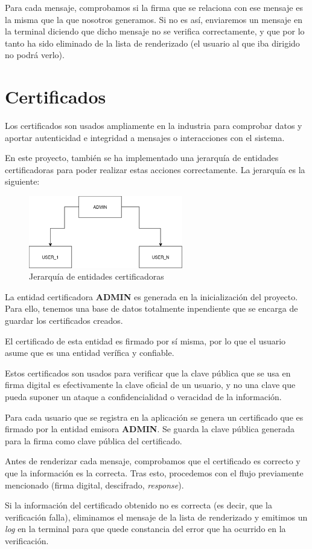 \documentclass[a4paper,11pt]{article}
\begin{document}
Para cada mensaje, comprobamos si la firma que se relaciona con ese mensaje es la misma que la que nosotros generamos. Si no es así, enviaremos un mensaje en la terminal diciendo que dicho mensaje no se verifica correctamente, y que por lo tanto ha sido eliminado de la lista de renderizado (el usuario al que iba dirigido no podrá verlo).

\section{Certificados}
\label{sec:certificados}

Los certificados son usados ampliamente en la industria para comprobar datos y aportar autenticidad e integridad a mensajes o interacciones con el sistema.

En este proyecto, también se ha implementado una jerarquía de entidades certificadoras para poder realizar estas acciones correctamente. La jerarquía es la siguiente:

\begin{figure}[h]
    \centering
    \includegraphics[width=0.6\textwidth]{./images/certificatesStructure.png}
    \caption{Jerarquía de entidades certificadoras}
    \label{fig:jerarquia}
\end{figure}

La entidad certificadora \textbf{ADMIN} es generada en la inicialización del proyecto. Para ello, tenemos una base de datos totalmente inpendiente que se encarga de guardar los certificados creados.

El certificado de esta entidad es firmado por sí misma, por lo que el usuario asume que es una entidad verífica y confiable.

Estos certificados son usados para verificar que la clave pública que se usa en firma digital es efectivamente la clave oficial de un usuario, y no una clave que pueda suponer un ataque a confidencialidad o veracidad de la información.

Para cada usuario que se registra en la aplicación se genera un certificado que es firmado por la entidad emisora \textbf{ADMIN}. Se guarda la clave pública generada para la firma como clave pública del certificado.

Antes de renderizar cada mensaje, comprobamos que el certificado es correcto y que la información es la correcta. Tras esto, procedemos con el flujo previamente mencionado (firma digital, descifrado, \textit{response}). 

Si la información del certificado obtenido no es correcta (es decir, que la verificación falla), eliminamos el mensaje de la lista de renderizado y emitimos un \textit{log} en la terminal para que quede constancia del error que ha ocurrido en la verificación.
\end{document}
